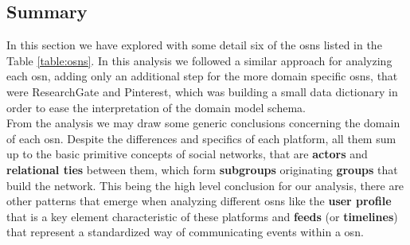\subsection{Summary}
In this section we have explored with some detail six of the \glspl{osn} listed in the Table \ref{table:osns}. In this analysis we followed a similar approach for analyzing each \gls{osn}, adding only an additional step for the more domain specific \glspl{osn}, that were ResearchGate and Pinterest, which was building a small data dictionary in order to ease the interpretation of the domain model schema.\\
\indent From the analysis we may draw some generic conclusions concerning the domain of each \gls{osn}. Despite the differences and specifics of each platform, all them sum up to the basic primitive concepts of social networks, that are \textbf{actors} and \textbf{relational ties} between them, which form \textbf{subgroups} originating \textbf{groups} that build the network. This being the high level conclusion for our analysis, there are other patterns that emerge when analyzing different \glspl{osn} like the \textbf{user profile} that is a key element characteristic of these platforms and \textbf{feeds} (or \textbf{timelines}) that represent a standardized way of communicating events within a \gls{osn}.
